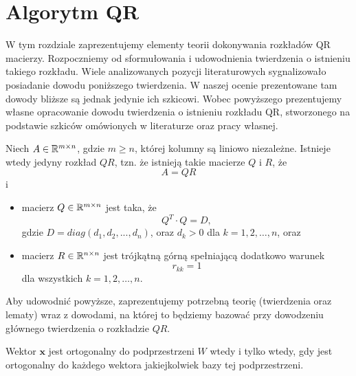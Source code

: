 \documentclass[12pt,a4paper]{report}
\newcommand{\vr}[1]{\mathbf{#1}}
\newcommand{\mx}[1]{{#1}}
\begin{document}
\chapter{Algorytm QR}

W tym rozdziale zaprezentujemy elementy teorii dokonywania rozkładów QR macierzy. Rozpoczniemy od sformułowania i udowodnienia twierdzenia o istnieniu takiego rozkładu. Wiele analizowanych pozycji literaturowych sygnalizowało posiadanie dowodu poniższego twierdzenia. W naszej ocenie prezentowane tam dowody bliższe są jednak jedynie ich szkicowi. Wobec powyższego prezentujemy własne opracowanie dowodu twierdzenia o istnieniu rozkładu QR, stworzonego na podstawie szkiców omówionych w literaturze oraz pracy własnej. 

\begin{theorem}[O rozkładzie QR]\label{theorem-qr-docomposition}
Niech $\mx{A} \in \setR^{m \times n}$, gdzie $m\ge n$, której kolumny są liniowo niezależne. Istnieje wtedy jedyny rozkład $\mx{QR}$, tzn. że istnieją takie macierze $\mx{Q}$ i $\mx{R}$, że
$$
\mx{A} = \mx{Q} \mx{R}
$$ 
i
\begin{itemize}
\item macierz $\mx{Q} \in \setR^{m \times n} $ jest taka, że 
$$
Q^{T}\cdot Q=D,
$$
gdzie $D= diag (d_{1}, d_{2}, ..., d_{n})$, oraz $d_{k}>0$ dla $k = 1, 2, \ldots, n$, oraz
\item macierz $\mx{R} \in \setR^{n \times n}$ jest trójkątną górną spełniającą dodatkowo warunek 
$$
r_{kk}= 1 
$$ 
dla wszystkich $k = 1, 2, \ldots, n$.
\end{itemize} 
\end{theorem}

Aby udowodnić powyższe, zaprezentujemy potrzebną teorię (twierdzenia oraz lematy) wraz z dowodami, na której to będziemy bazować przy dowodzeniu głównego twierdzenia o rozkładzie $QR$. 

\begin{theorem}
Wektor $\vr{x}$ jest ortogonalny do podprzestrzeni $W$ wtedy i tylko wtedy, gdy jest ortogonalny do każdego wektora jakiejkolwiek bazy tej podprzestrzeni.
\end{theorem}
\end{document}

